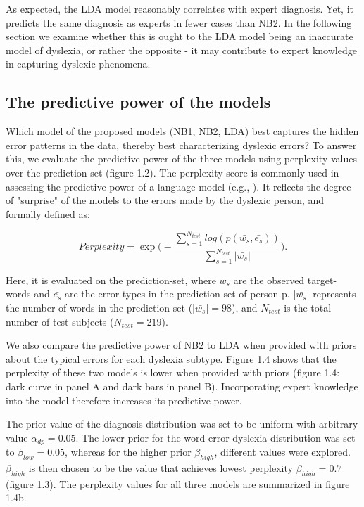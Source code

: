{{As expected, the LDA model reasonably correlates with expert diagnosis. Yet, it predicts the same diagnosis as experts in fewer cases than NB2. In the following section we examine whether this is ought to the LDA model being an inaccurate model of dyslexia, or rather the opposite - it may contribute to expert knowledge in capturing dyslexic phenomena.

\subsection{The predictive power of the models}
Which model of the proposed models (NB1, NB2, LDA) best captures the hidden error patterns in the data, thereby best characterizing dyslexic errors? To answer this, we evaluate the predictive power of the three models using perplexity values over the prediction-set (figure 1.2).
The perplexity score is commonly used in assessing the predictive power of a language model (e.g., \citealp{bnj03}). It reflects the degree of "surprise" of the models to the errors made by the dyslexic person, and formally defined as: 

\begin{equation}
Perplexity = \exp{\Bigg(-\frac{\sum_{s=1}^{N_{test}} log(p(\bar{w_s}, \bar{e_s}))}{\sum_{s=1}^{N_{test}}|\bar{w_s}|}\Bigg)}.
\end{equation}

Here, it is evaluated on the prediction-set, where $ \bar{w_s} $ are the observed target-words and $ \bar{e_s} $ are the error types in the prediction-set of person p. $|\bar{w_s}|$ represents the number of words in the prediction-set ($|\bar{w_s}| = 98$), and $ N_{test} $ is the total number of test subjects ($ N_{test} = 219 $).

We also compare the predictive power of NB2 to LDA when provided with priors about the typical errors for each dyslexia subtype. Figure 1.4 shows that the perplexity of these two models is lower when provided with priors (figure 1.4: dark curve in panel A and dark bars in panel B). Incorporating expert knowledge into the model therefore increases its predictive power.

The prior value of the diagnosis distribution was set to be uniform with arbitrary value $ \alpha_{dp} = 0.05 $. The lower prior for the word-error-dyslexia distribution was set to $ \beta_{low} = 0.05 $, whereas for the higher prior $ \beta_{high} $, different values were explored. $ \beta_{high} $ is then chosen to be the value that achieves lowest perplexity $ \beta_{high} = 0.7 $ (figure 1.3). The perplexity values for all three models are summarized in figure 1.4b.

}}
